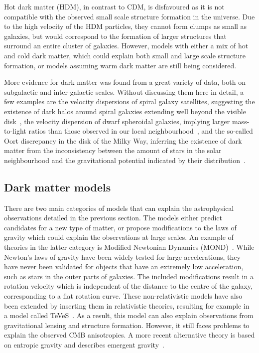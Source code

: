 Hot dark matter (HDM), in contrast to CDM, is disfavoured as it is not compatible with the observed small scale structure formation in the universe. Due to the high velocity of the HDM particles, they cannot form clumps as small as galaxies, but would correspond to the formation of larger structures that surround an entire cluster of galaxies. However, models with either a mix of hot and cold dark matter, which could explain both small and large scale structure formation, or models assuming warm dark matter are still being considered.

More evidence for dark matter was found from a great variety of data, both on subgalactic and inter-galactic scales. Without discussing them here in detail, a few examples are the velocity dispersions of spiral galaxy satellites, suggesting the existence of dark halos around spiral galaxies extending well beyond the visible disk~\cite{Azzaro:2003hp}, the velocity dispersion of dwarf spheroidal galaxies, implying larger mass-to-light ratios than those observed in our local neighbourhood~\cite{Mateo:1998wg}, and the so-called Oort discrepancy in the disk of the Milky Way, inferring the existence of dark matter from the inconsistency between the amount of stars in the solar neighbourhood and the gravitational potential indicated by their distribution~\cite{Bahcall:1991qs}.

\subsection{Dark matter models}

There are two main categories of models that can explain the astrophysical observations detailed in the previous section. The models either predict candidates for a new type of matter, or propose modifications to the laws of gravity which could explain the observations at large scales. An example of theories in the latter category is Modified Newtonian Dynamics (MOND)~\cite{Milgrom:1983ca,Milgrom:1983pn,Milgrom:1983zz}. While Newton's laws of gravity have been widely tested for large accelerations, they have never been validated for objects that have an extremely low acceleration, such as stars in the outer parts of galaxies. The included modifications result in a rotation velocity which is independent of the distance to the centre of the galaxy, corresponding to a flat rotation curve. These non-relativistic models have also been extended by inserting them in relativistic theories, resulting for example in a model called TeVeS~\cite{Bekenstein:2004ne}. As a result, this model can also explain observations from gravitational lensing and structure formation. However, it still faces problems to explain the observed \ac{CMB} anisotropies. A more recent alternative theory is based on entropic gravity and describes emergent gravity~\cite{Verlinde:2016toy}.

